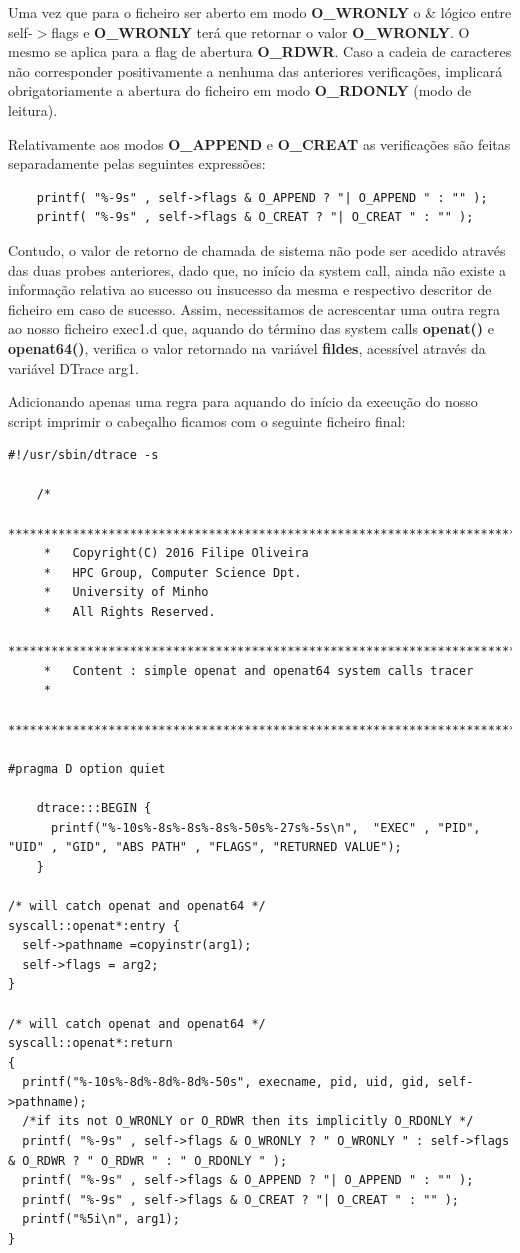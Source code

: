 \documentclass[a4paper]{article}
\begin{document}
    Uma vez que para o ficheiro ser aberto em modo \textbf{O\_WRONLY} o \& lógico entre self-$>$flags e  \textbf{O\_WRONLY} terá que retornar o valor  \textbf{O\_WRONLY}. O mesmo se aplica para a flag de abertura  \textbf{O\_RDWR}. Caso a cadeia de caracteres não corresponder positivamente a nenhuma das anteriores verificações, implicará obrigatoriamente a abertura do ficheiro em modo  \textbf{O\_RDONLY} (modo de leitura).\par 
    Relativamente aos modos  \textbf{O\_APPEND} e  \textbf{O\_CREAT} as verificações são feitas separadamente pelas seguintes expressões:
    \begin{lstlisting}
    printf( "%-9s" , self->flags & O_APPEND ? "| O_APPEND " : "" );
    printf( "%-9s" , self->flags & O_CREAT ? "| O_CREAT " : "" );
    \end{lstlisting}
    \par 
    Contudo, o valor de retorno de chamada de sistema não pode ser acedido através das duas probes anteriores, dado que, no início da system call, ainda não existe a informação relativa ao sucesso ou insucesso da mesma e respectivo descritor de ficheiro em caso de sucesso. Assim, necessitamos de acrescentar uma outra regra ao nosso ficheiro exec1.d que, aquando do término das system calls \textbf{openat()} e \textbf{openat64()}, verifica o valor retornado na variável \textbf{fildes}, acessível através da variável DTrace arg1.\par 
    Adicionando apenas uma regra para aquando do início da execução do nosso script imprimir o cabeçalho ficamos com o seguinte ficheiro final:
    \begin{lstlisting}[basicstyle=\scriptsize]
#!/usr/sbin/dtrace -s

    /*
     ********************************************************************************
     *   Copyright(C) 2016 Filipe Oliveira
     *   HPC Group, Computer Science Dpt.
     *   University of Minho
     *   All Rights Reserved.
     ********************************************************************************
     *   Content : simple openat and openat64 system calls tracer
     *     
     ********************************************************************************/

#pragma D option quiet

    dtrace:::BEGIN {
      printf("%-10s%-8s%-8s%-8s%-50s%-27s%-5s\n",  "EXEC" , "PID", "UID" , "GID", "ABS PATH" , "FLAGS", "RETURNED VALUE");
    }

/* will catch openat and openat64 */
syscall::openat*:entry {
  self->pathname =copyinstr(arg1);
  self->flags = arg2;
}

/* will catch openat and openat64 */
syscall::openat*:return
{
  printf("%-10s%-8d%-8d%-8d%-50s", execname, pid, uid, gid, self->pathname);
  /*if its not O_WRONLY or O_RDWR then its implicitly O_RDONLY */
  printf( "%-9s" , self->flags & O_WRONLY ? " O_WRONLY " : self->flags & O_RDWR ? " O_RDWR " : " O_RDONLY " ); 
  printf( "%-9s" , self->flags & O_APPEND ? "| O_APPEND " : "" );
  printf( "%-9s" , self->flags & O_CREAT ? "| O_CREAT " : "" );
  printf("%5i\n", arg1); 
}


\end{lstlisting}
\end{document}
